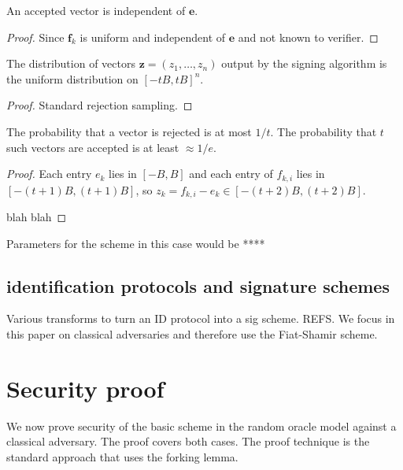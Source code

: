 \documentclass{llncs}
\newcommand{\e}{\textbf{e}}
\newcommand{\f}{\textbf{f}}
\newcommand{\z}{\textbf{z}}
\begin{document}
\begin{lemma}
An accepted vector is independent of $\e$.
\end{lemma}

\begin{proof}
Since $\f_k$ is uniform and independent of $\e$ and not known to verifier.
\end{proof}


\begin{lemma} \label{lem:sim2}
The  distribution of vectors $\z = (z_1, \dots, z_n) $ output by the signing algorithm is the uniform distribution on $[-tB,tB]^n$.
\end{lemma}

\begin{proof}
Standard rejection sampling.
\end{proof}


\begin{lemma}
The probability that a vector is rejected is at most $1/t$.
The probability that $t$ such vectors are accepted is at least $ \approx 1/e$.
\end{lemma}

\begin{proof}
Each entry $e_k$ lies in $[-B,B]$ and each entry of $f_{k,i}$ lies in $[-(t+1)B, (t+1)B]$,
so $z_k = f_{k,i} - e_k \in [-(t+2)B, (t+2)B]$.

blah blah
\end{proof}


Parameters for the scheme in this case would be ****




\subsection{identification protocols and signature schemes}

Various transforms to turn an ID protocol into a sig scheme.
REFS.
We focus in this paper on classical adversaries and therefore use the Fiat-Shamir scheme.



\section{Security proof}


We now prove security of the basic scheme in the random oracle model against a classical adversary. The proof covers both cases.
The proof technique is the standard approach that uses the forking lemma.
\end{document}
